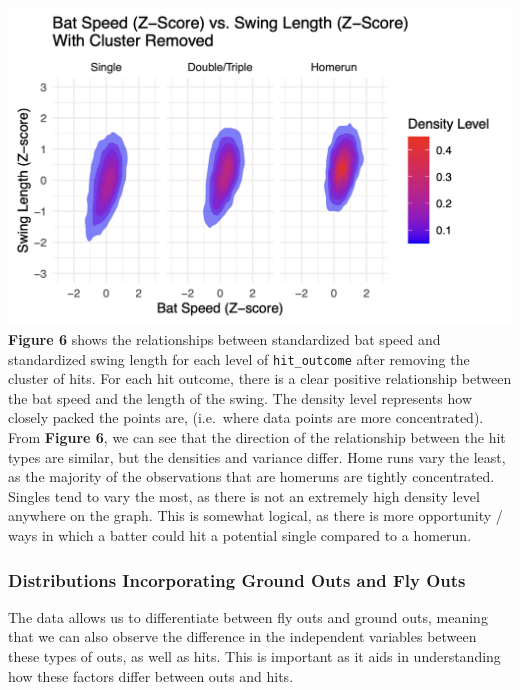 \documentclass[
  letterpaper,
  DIV=11,
  numbers=noendperiod]{scrartcl}
\begin{document}
\includegraphics{./images/figures/fig6.png} \textbf{Figure 6} shows the
relationships between standardized bat speed and standardized swing
length for each level of \texttt{hit\_outcome} after removing the
cluster of hits. For each hit outcome, there is a clear positive
relationship between the bat speed and the length of the swing. The
density level represents how closely packed the points are, (i.e.~where
data points are more concentrated). From \textbf{Figure 6}, we can see
that the direction of the relationship between the hit types are
similar, but the densities and variance differ. Home runs vary the
least, as the majority of the observations that are homeruns are tightly
concentrated. Singles tend to vary the most, as there is not an
extremely high density level anywhere on the graph. This is somewhat
logical, as there is more opportunity / ways in which a batter could hit
a potential single compared to a homerun.

\subsubsection{Distributions Incorporating Ground Outs and Fly
Outs}\label{distributions-incorporating-ground-outs-and-fly-outs}

The data allows us to differentiate between fly outs and ground outs,
meaning that we can also observe the difference in the independent
variables between these types of outs, as well as hits. This is
important as it aids in understanding how these factors differ between
outs and hits.
\end{document}
